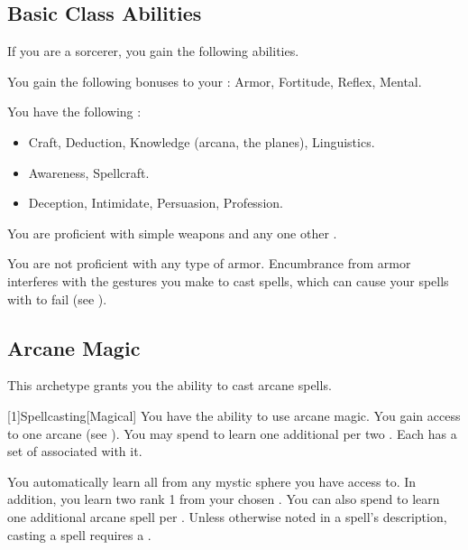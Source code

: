     \subsection{Basic Class Abilities}
        If you are a sorcerer, you gain the following abilities.

        You gain the following bonuses to your :  Armor,  Fortitude,  Reflex,  Mental.

        You have the following :
        \begin{itemize}
            \item {} Craft, Deduction, Knowledge (arcana, the planes), Linguistics.
            \item {} Awareness, Spellcraft.
            \item {} Deception, Intimidate, Persuasion, Profession.
        \end{itemize}

        You are proficient with simple weapons and any one other .

        You are not proficient with any type of armor.
        Encumbrance from armor interferes with the gestures you make to cast spells, which can cause your spells with  to fail (see ).

    \subsection{Arcane Magic}
        This archetype grants you the ability to cast arcane spells.

        [1]{Spellcasting}[Magical]
        You have the ability to use arcane magic.
        You gain access to one arcane  (see ).
        You may spend  to learn one additional  per two .
        Each  has a set of  associated with it.

        You automatically learn all  from any mystic sphere you have access to.
        In addition, you learn two rank 1  from your chosen .
        You can also spend  to learn one additional arcane spell per .
        Unless otherwise noted in a spell's description, casting a spell requires a .


